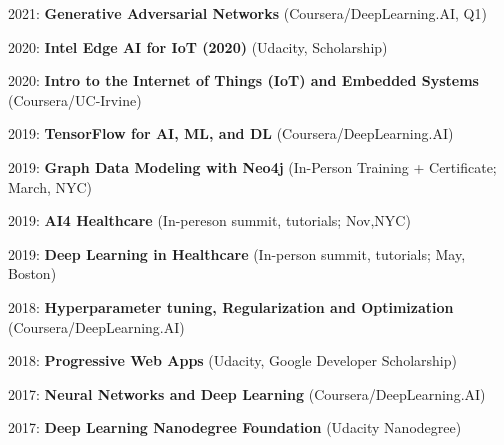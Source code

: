\begin{itemize*}
  \item 2021: \textbf{Generative Adversarial Networks} (Coursera/DeepLearning.AI, Q1)
  \item 2020: \textbf{Intel Edge AI for IoT (2020)} (Udacity, Scholarship)
  \item 2020: \textbf{Intro to the Internet of Things (IoT) and Embedded Systems} (Coursera/UC-Irvine)
  \item 2019: \textbf{TensorFlow for AI, ML, and DL} (Coursera/DeepLearning.AI)
  \item 2019: \textbf{Graph Data Modeling with Neo4j} (In-Person Training + Certificate; March, NYC)
  \item 2019: \textbf{AI4 Healthcare} (In-pereson summit, tutorials; Nov,NYC)
  \item 2019: \textbf{Deep Learning in Healthcare} (In-person summit, tutorials; May, Boston)
  \item 2018: \textbf{Hyperparameter tuning, Regularization and Optimization} (Coursera/DeepLearning.AI)
  \item 2018: \textbf{Progressive Web Apps} (Udacity, Google Developer Scholarship)
  \item 2017: \textbf{Neural Networks and Deep Learning} (Coursera/DeepLearning.AI)
  \item 2017: \textbf{Deep Learning Nanodegree Foundation} (Udacity Nanodegree)
\end{itemize*}
